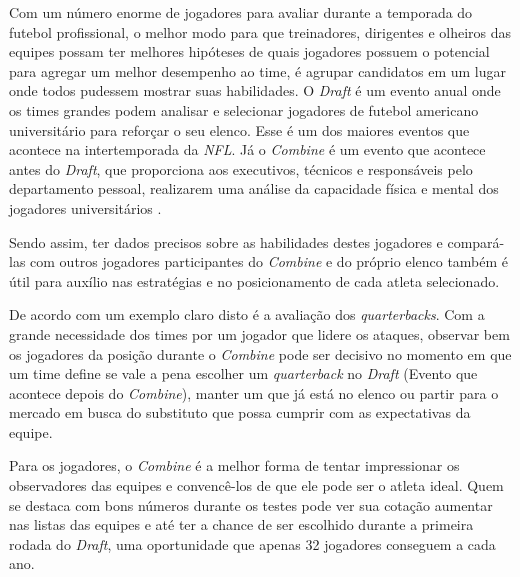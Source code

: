 Com um número enorme de jogadores para avaliar durante a temporada do futebol profissional, o melhor modo para que treinadores, dirigentes e olheiros das equipes possam ter melhores hipóteses de quais jogadores possuem o potencial para agregar um melhor desempenho ao time, é agrupar candidatos em um lugar onde todos pudessem mostrar suas habilidades. O \textit{Draft} é um evento anual onde os times grandes podem analisar e selecionar jogadores de futebol americano universitário para reforçar o seu elenco. Esse é um dos maiores eventos que acontece na intertemporada da \textit{NFL}. Já o \textit{Combine} é um evento que acontece antes do \textit{Draft}, que proporciona aos executivos, técnicos e responsáveis pelo departamento pessoal, realizarem uma análise da capacidade física e mental dos jogadores universitários \cite{MCGEE2003}.

Sendo assim, ter dados precisos sobre as habilidades destes jogadores e compará-las com outros jogadores participantes do \textit{Combine} e do próprio elenco também é útil para auxílio nas estratégias e no posicionamento de cada atleta selecionado.

De acordo com  um exemplo claro disto é a avaliação dos \textit{quarterbacks}. Com a grande necessidade dos times por um jogador que lidere os ataques, observar bem os jogadores da posição durante o \textit{Combine} pode ser decisivo no momento em que um time define se vale a pena escolher um \textit{quarterback} no \textit{Draft} (Evento que acontece depois do \textit{Combine}), manter um que já está no elenco ou partir para o mercado em busca do substituto que possa cumprir com as expectativas da equipe.

Para os jogadores, o \textit{Combine} é a melhor forma de tentar impressionar os observadores das equipes e convencê-los de que ele pode ser o atleta ideal. Quem se destaca com bons números durante os testes pode ver sua cotação aumentar nas listas das equipes e até ter a chance de ser escolhido durante a primeira rodada do \textit{Draft}, uma oportunidade que apenas 32 jogadores conseguem a cada ano.




